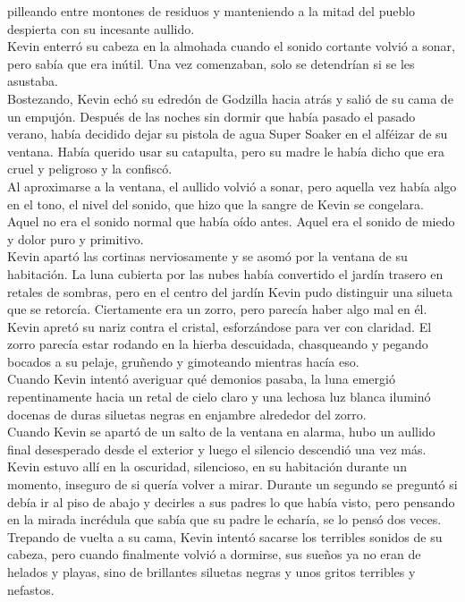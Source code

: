 pilleando entre montones de residuos y manteniendo a la mitad del pueblo
despierta con su incesante aullido.\\
Kevin enterró su cabeza en la almohada cuando el sonido cortante volvió
a sonar, pero sabía que era inútil. Una vez comenzaban, solo se
detendrían si se les asustaba.\\
Bostezando, Kevin echó su edredón de Godzilla hacia atrás y salió de su
cama de un empujón. Después de las noches sin dormir que había pasado el
pasado verano, había decidido dejar su pistola de agua Super Soaker en
el alféizar de su ventana. Había querido usar su catapulta, pero su
madre le había dicho que era cruel y peligroso y la confiscó.\\
Al aproximarse a la ventana, el aullido volvió a sonar, pero aquella vez
había algo en el tono, el nivel del sonido, que hizo que la sangre de
Kevin se congelara. Aquel no era el sonido normal que había oído antes.
Aquel era el sonido de miedo y dolor puro y primitivo.\\
Kevin apartó las cortinas nerviosamente y se asomó por la ventana de su
habitación. La luna cubierta por las nubes había convertido el jardín
trasero en retales de sombras, pero en el centro del jardín Kevin pudo
distinguir una silueta que se retorcía. Ciertamente era un zorro, pero
parecía haber algo mal en él. Kevin apretó su nariz contra el cristal,
esforzándose para ver con claridad. El zorro parecía estar rodando en la
hierba descuidada, chasqueando y pegando bocados a su pelaje, gruñendo y
gimoteando mientras hacía eso.\\
Cuando Kevin intentó averiguar qué demonios pasaba, la luna emergió
repentinamente hacia un retal de cielo claro y una lechosa luz blanca
iluminó docenas de duras siluetas negras en enjambre alrededor del
zorro.\\
Cuando Kevin se apartó de un salto de la ventana en alarma, hubo un
aullido final desesperado desde el exterior y luego el silencio
descendió una vez más.\\
Kevin estuvo allí en la oscuridad, silencioso, en su habitación durante
un momento, inseguro de si quería volver a mirar. Durante un segundo se
preguntó si debía ir al piso de abajo y decirles a sus padres lo que
había visto, pero pensando en la mirada incrédula que sabía que su padre
le echaría, se lo pensó dos veces.\\
Trepando de vuelta a su cama, Kevin intentó sacarse los terribles
sonidos de su cabeza, pero cuando finalmente volvió a dormirse, sus
sueños ya no eran de helados y playas, sino de brillantes siluetas
negras y unos gritos terribles y nefastos.\\
